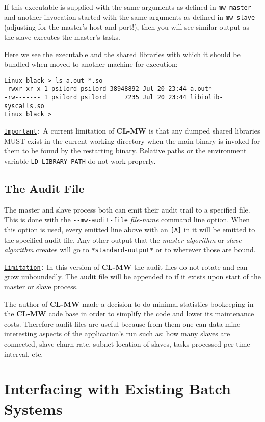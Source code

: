 \documentclass[titlepage,12pt]{book}
\newcommand{\xsmall}{\latexhtml{\small}{}}
\newcommand{\xnormalsize}{\latexhtml{\normalsize}{}}
\newcommand{\clmw}{\xsmall\textbf{CL-MW}\xnormalsize\xspace}
\newcommand{\sa}{\textit{slave algorithm}\xspace}
\newcommand{\ma}{\textit{master algorithm}\xspace}
\newcommand{\dash}{\texttt{-}}
\newcommand{\func}[1]{\xsmall\mbox{\uppercase{\texttt{#1}}}\xnormalsize\xspace}
\newcommand{\var}[1]{\texttt{#1}\xspace}
\newcommand{\EnvVar}[1]{\texttt{#1}\xspace}
\newcommand{\OptionV}[2]{\dash\dash\texttt{#1} \textit{#2}}
\newcommand{\Important}{\texttt{\underline{Important}:}\xspace}
\newcommand{\Limitation}{\texttt{\underline{Limitation}:}\xspace}
\begin{document}
If this executable is supplied with the same arguments as defined in
\func{mw-master} and another invocation started with the same arguments
as defined in \func{mw-slave} (adjusting for the master's host and
port!), then you will see similar output as the slave executes the
master's tasks.

Here we see the executable and the shared libraries with which it should be
bundled when moved to another machine for execution:

\small
\begin{verbatim}
Linux black > ls a.out *.so
-rwxr-xr-x 1 psilord psilord 38948892 Jul 20 23:44 a.out*
-rw------- 1 psilord psilord     7235 Jul 20 23:44 libiolib-syscalls.so
Linux black >
\end{verbatim}
\normalsize

\Important A current limitation of \clmw is that any dumped
shared libraries MUST exist in the current working directory
when the main binary is invoked for them to be found by the
restarting binary. Relative paths or the environment variable
\EnvVar{LD\_LIBRARY\_PATH} do not work properly.

\section{The Audit File}

The master and slave process both can emit their
audit trail to a specified file. This is done with the
\OptionV{mw-audit-file}{file-name} command line option. When this
option is used, every emitted line above with an \texttt{[A]} in it
will be emitted to the specified audit file. Any other output that
the \ma or \sa creates will go to \var{*standard-output*} or to
wherever those are bound. 

\Limitation In this version of \clmw the audit files do not rotate
and can grow unboundedly. The audit file will be appended to if it
exists upon start of the master or slave process.

The author of \clmw made a decision to do minimal statistics
bookeeping in the \clmw code base in order to simplify the code and
lower its maintenance costs.  Therefore audit files are useful because
from them one can data-mine interesting aspects of the application's
run such as: how many slaves are connected, slave churn rate, subnet
location of slaves, tasks processed per time interval, etc.

\chapter{Interfacing with Existing Batch Systems}
\end{document}
